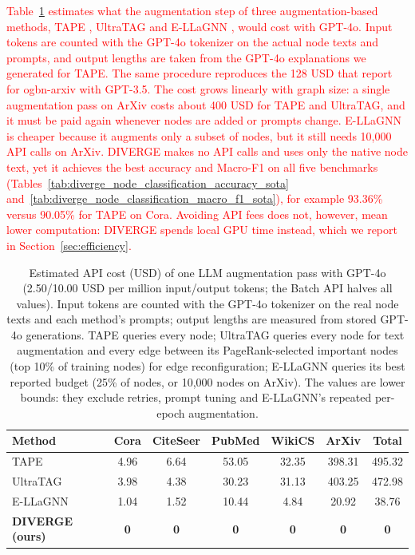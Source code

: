 \documentclass[a4paper,fleqn]{cas-sc}
\newcommand{\revone}[1]{\textcolor{red}{#1}}   %
\begin{document}
\revone{Table~\ref{tab:api_cost} estimates what the augmentation step of three augmentation-based methods, TAPE \citep{he2024harnessing}, UltraTAG \citep{yu2025ultratag} and E-LLaGNN \citep{Jaiswal2024AllAgainstSome}, would cost with GPT-4o. Input tokens are counted with the GPT-4o tokenizer on the actual node texts and prompts, and output lengths are taken from the GPT-4o explanations we generated for TAPE. The same procedure reproduces the 128 USD that \citet{he2024harnessing} report for ogbn-arxiv with GPT-3.5. The cost grows linearly with graph size: a single augmentation pass on ArXiv costs about 400 USD for TAPE and UltraTAG, and it must be paid again whenever nodes are added or prompts change. E-LLaGNN is cheaper because it augments only a subset of nodes, but it still needs 10{,}000 API calls on ArXiv. DIVERGE makes no API calls and uses only the native node text, yet it achieves the best accuracy and Macro-F1 on all five benchmarks (Tables~\ref{tab:diverge_node_classification_accuracy_sota} and~\ref{tab:diverge_node_classification_macro_f1_sota}), for example 93.36\% versus 90.05\% for TAPE on Cora. Avoiding API fees does not, however, mean lower computation: DIVERGE spends local GPU time instead, which we report in Section~\ref{sec:efficiency}.}

\begin{table}[htbp]
\centering\color{red}
\caption{Estimated API cost (USD) of one LLM augmentation pass with GPT-4o (2.50/10.00 USD per million input/output tokens; the Batch API halves all values). Input tokens are counted with the GPT-4o tokenizer on the real node texts and each method's prompts; output lengths are measured from stored GPT-4o generations. TAPE queries every node; UltraTAG queries every node for text augmentation and every edge between its PageRank-selected important nodes (top 10\% of training nodes) for edge reconfiguration; E-LLaGNN queries its best reported budget (25\% of nodes, or 10{,}000 nodes on ArXiv). The values are lower bounds: they exclude retries, prompt tuning and E-LLaGNN's repeated per-epoch augmentation.}
\label{tab:api_cost}
\small
\setlength{\tabcolsep}{3pt}
\begin{tabular*}{\columnwidth}{@{\extracolsep{\fill}} lcccccc @{}}
\toprule
\textbf{Method} & \textbf{Cora} & \textbf{CiteSeer} & \textbf{PubMed} & \textbf{WikiCS} & \textbf{ArXiv} & \textbf{Total} \\
\midrule
TAPE & 4.96 & 6.64 & 53.05 & 32.35 & 398.31 & 495.32 \\
UltraTAG & 3.98 & 4.38 & 30.23 & 31.13 & 403.25 & 472.98 \\
E-LLaGNN & 1.04 & 1.52 & 10.44 & 4.84 & 20.92 & 38.76 \\
\midrule
\textbf{DIVERGE (ours)} & \textbf{0} & \textbf{0} & \textbf{0} & \textbf{0} & \textbf{0} & \textbf{0} \\
\bottomrule
\end{tabular*}
\end{table}
\end{document}
